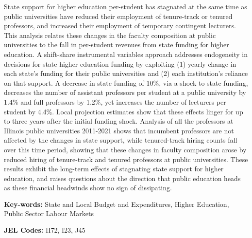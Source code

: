 \noindent
State support for higher education per-student has stagnated at the same time as public universities have reduced their employment of tenure-track or tenured professors, and increased their employment of temporary contingent lecturers.
This analysis relates these changes in the faculty composition at public universities to the fall in per-student revenues from state funding for higher education.
A shift-share instrumental variables approach addresses endogeneity in decisions for state higher education funding by exploiting (1) yearly change in each state's funding for their public universities and (2) each institution's reliance on that support.
A decrease in state funding of 10\%, via a shock to state funding, decreases the number of assistant professors per student at a public university by 1.4\% and full professors by 1.2\%, yet increases the number of lecturers per student by 4.4\%.
Local projection estimates show that these effects linger for up to three years after the initial funding shock.
Analysis of all the professors at Illinois public universities 2011-2021 shows that incumbent professors are not affected by the changes in state support, while tenured-track hiring counts fall over this time period, showing that these changes in faculty composition arose by reduced hiring of tenure-track and tenured professors at public universities.
These results exhibit the long-term effects of stagnating state support for higher education, and raises questions about the direction that public education heads as these financial headwinds show no sign of dissipating.

\noindent
\textbf{Key-words:}
State and Local Budget and Expenditures,
Higher Education,
Public Sector Labour Markets

\noindent
\textbf{JEL Codes:} H72, I23, J45
